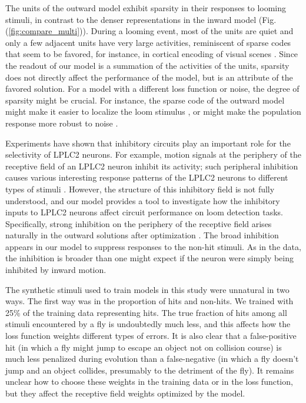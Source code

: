 \documentclass[pdftex,9pt,lineno]{elife}
\begin{document}
The units of the outward model exhibit sparsity in their responses to looming stimuli, in contrast to the denser representations in the inward model (Fig. (\ref{fig:compare_multi})). During a looming event, most of the units are quiet and only a few adjacent units have very large activities, reminiscent of sparse codes that seem to be favored, for instance, in cortical encoding of visual scenes \citep{olshausen1996emergence,olshausen1997sparse}. Since the readout of our model is a summation of the activities of the units, sparsity does not directly affect the performance of the model, but is an attribute of the favored solution. For a model with a different loss function or noise, the degree of sparsity might be crucial. For instance, the sparse code of the outward model might make it easier to localize the loom stimulus \citep{morimoto2020spatial}, or might make the population response more robust to noise \citep{field1994goal}. 

Experiments have shown that inhibitory circuits play an important role for the selectivity of LPLC2 neurons. For example, motion signals at the periphery of the receptive field of an LPLC2 neuron inhibit its activity; such peripheral inhibition causes various interesting response patterns of the LPLC2 neurons to different types of stimuli \citep{klapoetke2017ultra}. However, the structure of this inhibitory field is not fully understood, and our model provides a tool to investigate how the inhibitory inputs to LPLC2 neurons affect circuit performance on loom detection tasks. Specifically, strong inhibition on the periphery of the receptive field arises naturally in the outward solutions after optimization \citep{klapoetke2017ultra}. The broad inhibition appears in our model to suppress responses to the non-hit stimuli. As in the data, the inhibition is broader than one might expect if the neuron were simply being inhibited by inward motion.

The synthetic stimuli used to train models in this study were unnatural in two ways. The first way was in the proportion of hits and non-hits. We trained with 25\% of the training data representing hits. The true fraction of hits among all stimuli encountered by a fly is undoubtedly much less, and this affects how the loss function weights different types of errors. It is also clear that a false-positive hit (in which a fly might jump to escape an object not on collision course) is much less penalized during evolution than a false-negative (in which a fly doesn't jump and an object collides, presumably to the detriment of the fly). It remains unclear how to choose these weights in the training data or in the loss function, but they affect the receptive field weights optimized by the model.
\end{document}
